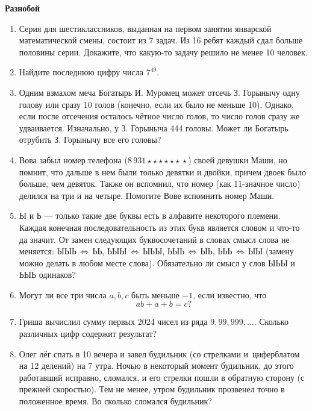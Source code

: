\documentclass{article}
\begin{document}
\large
	
\begin{center}
	\textbf{Разнобой}
\end{center}


\begin{enumerate}[label*=\protect\fbox{\arabic{enumi}}]

\item Серия для шестиклассников, выданная на первом занятии январской математической смены, состоит из 7 задач. Из 16 ребят каждый сдал больше половины серии. Докажите, что какую-то задачу решило не менее 10 человек.

\item Найдите последнюю цифру числа $7^{49}$.


\item Одним взмахом меча Богатырь И. Муромец может отсечь З. Горынычу одну голову или сразу 10 голов (конечно, если их было не меньше 10). Однако, если после отсечения осталось чётное число голов, то число голов сразу же удваивается. Изначально, у З. Горыныча 444 головы. Может ли Богатырь отрубить З. Горынычу все его головы?

\item Вова забыл номер телефона ($8\,931\star\star\star\star\star\star\,\star$) своей девушки Маши, но помнит, что дальше в нем были только девятки и двойки, причем двоек было больше, чем девяток. Также он вспомнил, что номер (как 11-значное число) делился на три и на четыре. Помогите Вове вспомнить номер Маши.

\item Ы и Ь --- только такие две буквы есть в алфавите некоторого племени. Каждая конечная последовательность из этих букв является словом и что-то да значит. От замен следующих буквосочетаний в словах смысл слова не меняется: ЫЫЬ\,$\Leftrightarrow$\,ЬЬ, ЬЫЫ\,$\Leftrightarrow$\,ЫЬЫ, ЬЫЬ\,$\Leftrightarrow$\,ЫЬ, ЬЬЬ\,$\Leftrightarrow$\,ЫЫ (замену можно делать в любом месте слова). Обязательно ли смысл у слов ЫЬЫ и ЬЫЬ одинаков?

\item Могут ли все три числа $a, b, c$ быть меньше $-1$, если известно, что $$ab+a+b = c?$$

\item Гриша вычислил сумму первых 2024 чисел из ряда $9, 99, 999, \ldots$. Сколько различных цифр содержит результат?

\item Олег лёг спать в 10 вечера и завел будильник (со стрелками и~циферблатом на 12 делений) на 7 утра. Ночью в некоторый момент будильник, до этого работавший исправно, сломался, и его стрелки пошли в обратную сторону (с прежней скоростью). Тем не менее, утром будильник прозвенел точно в положенное время. Во сколько сломался будильник? 


\end{enumerate}
\end{document}
